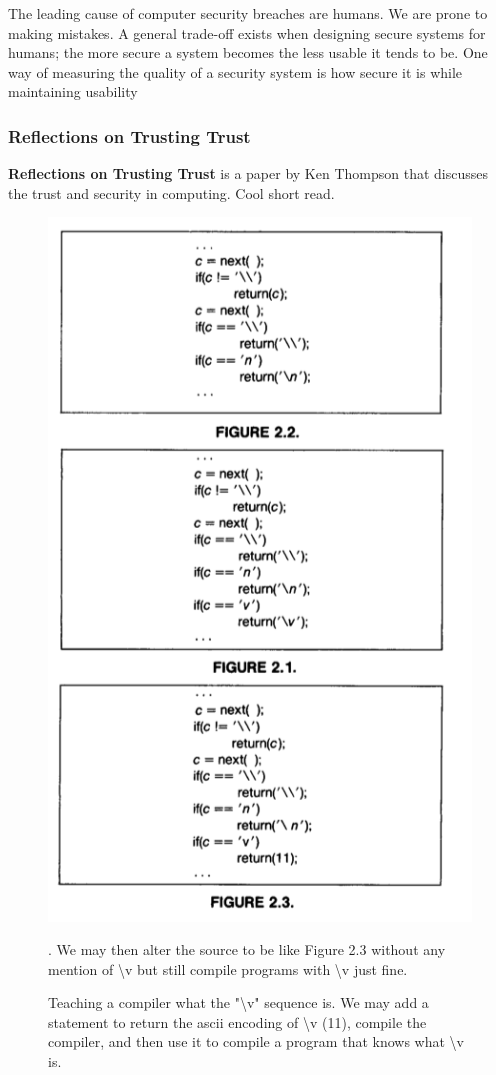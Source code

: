 \documentclass[../notes.tex]{subfiles}
\begin{document}
The leading cause of computer security breaches are humans. We are prone to making mistakes.
A general trade-off exists when designing secure systems for humans; the more secure a system becomes the less usable it  tends to be. One way of measuring the quality of a security system is how secure it is while maintaining usability

\subsubsection{Reflections on Trusting Trust}

\begin{blockquote}
    \textbf{Reflections on Trusting Trust} is a paper by Ken Thompson that discusses the trust and security in computing. Cool short read.
\end{blockquote}


\begin{figure}[H]
    \centering
    \includegraphics[width=0.8\linewidth]{img/image_2023-01-13-05-03-27.png}
    \caption{Teaching a compiler what the "\textbackslash v" sequence is. We may add a statement to return the ascii encoding of \textbackslash v (11), compile the compiler, and then use it to compile a program that knows what \textbackslash v is. }. We may then alter the source to be like Figure 2.3 without any mention of \textbackslash v but still compile programs with \textbackslash v just fine.
\end{figure}
\end{document}
